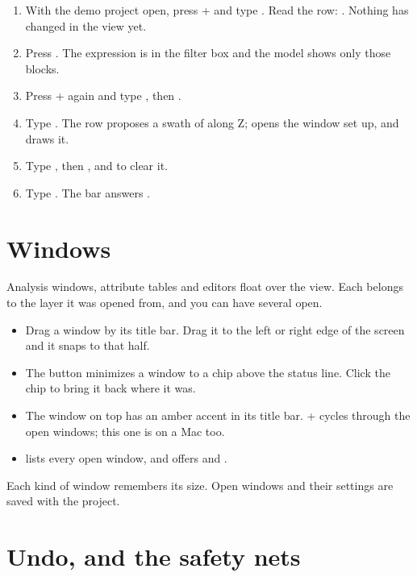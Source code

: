 \begin{tryit}
\begin{enumerate}
\item With the demo project open, press + and type . Read the row: . Nothing has changed in the view yet.
\item Press . The expression is in the filter box and the model shows only those blocks.
\item Press + again and type , then .
\item Type . The row proposes a swath of  along Z;  opens the window set up, and  draws it.
\item Type , then , and  to clear it.
\item Type . The bar answers .
\end{enumerate}
\end{tryit}

\section{Windows}\label{sec:start-windows}
Analysis windows, attribute tables and editors float over the view. Each belongs to the layer it was opened from, and you can have several open.

\begin{itemize}
\item Drag a window by its title bar. Drag it to the left or right edge of the screen and it snaps to that half.
\item The  button minimizes a window to a chip above the status line. Click the chip to bring it back where it was.
\item The window on top has an amber accent in its title bar. +\key{\textasciigrave} cycles through the open windows; this one is  on a Mac too.
\item {} lists every open window, and offers  and .
\end{itemize}

Each kind of window remembers its size. Open windows and their settings are saved with the project.

\section{Undo, and the safety nets}\label{sec:start-undo}
